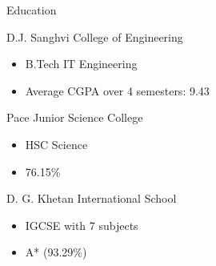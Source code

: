 \documentclass{article}
\newlength{\tabin}
\newlength{\secsep}
\newcommand{\lineunder}{\vspace*{-8pt} \\ \hspace*{-6pt} \hrulefill \\ \vspace*{-15pt}}
\newenvironment{tabbedsection}[1]{
	\begin{list}{}{
		\setlength{\itemsep}{0pt}
		\setlength{\labelsep}{0pt}
		\setlength{\labelwidth}{0pt}
		\setlength{\leftmargin}{\tabin}
		\setlength{\rightmargin}{\tabin}
		\setlength{\listparindent}{0pt}
		\setlength{\parsep}{0pt}
		\setlength{\parskip}{0pt}
		\setlength{\partopsep}{0pt}
		\setlength{\topsep}{#1}
	}
	\item[]
}{\end{list}}
\newenvironment{resume_section}[1]{
	\filbreak
	\vspace{2\secsep}
	\textsc{\large#1}
	\lineunder
	\begin{tabbedsection}{\secsep}
}{\end{tabbedsection}}
\newenvironment{resume_subsection}[2][]{
	\textbf{#2} \hfill {\footnotesize #1} \hspace{2em}
	\begin{tabbedsection}{0.5\secsep}
}{\end{tabbedsection}}
\newenvironment{subitems}{
	\renewcommand{\labelitemi}{-}
	\begin{itemize}
		\setlength{\labelsep}{1em}
}{\end{itemize}}
\begin{document}
\begin{resume_section}{Education}

	\begin{resume_subsection}[2019 - 2023 (expected)]{D.J. Sanghvi College of Engineering}
		\begin{subitems}
			\item B.Tech IT Engineering
			\item Average CGPA over 4 semesters: 9.43
		\end{subitems}
	\end{resume_subsection}


	\begin{resume_subsection}[2017 - 2019]{Pace Junior Science College}
		\begin{subitems}
			\item HSC Science
		\item 76.15{\%}
		\end{subitems}
	\end{resume_subsection}

	\begin{resume_subsection}[2017]{D. G. Khetan International School}
		\begin{subitems}
			\item IGCSE with 7 subjects
		\item A* (93.29{\%})
		\end{subitems}
	\end{resume_subsection}

\end{resume_section}

\vspace{1cm}
\end{document}
